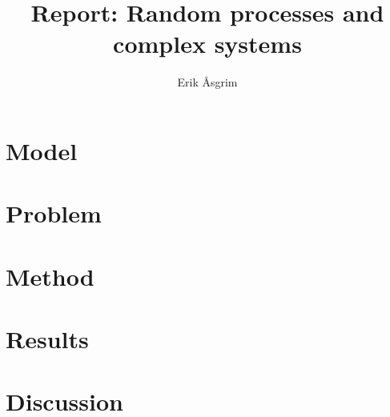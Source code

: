 \documentclass[a4paper,12pt]{article}
\title{Report: Random processes and complex systems}
\author{Erik Åsgrim}
\begin{document}
\maketitle

\section*{Model}

\section*{Problem}

\section*{Method}

\section*{Results}

\section*{Discussion}
\end{document}
